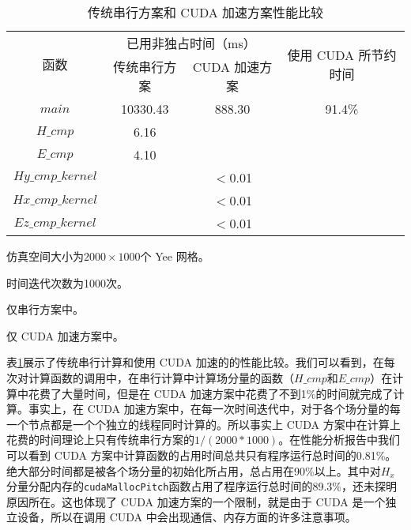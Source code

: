 \begin{table}[hp]
	\centering
	\begin{threeparttable}
		\caption{传统串行方案和 CUDA 加速方案性能比较}\label{ch4: cuda or not}
		\begin{tabular}{cccc}
			\toprule
			\multirow{2}{2em}{函数}&\multicolumn{2}{c}{已用非独占时间（ms）} & \multirow{2}{6em}{使用 CUDA 所节约时间}\\
			\cline{2-3}
			& 传统串行方案 & CUDA 加速方案 & \\ 
			
			\midrule
			$main$ & 10330.43 & 888.30 & 91.4\% \\
			$H\_cmp$\tnote{3} & 6.16 &  & \\ 
			$E\_cmp$\tnote{3} & 4.10 &  & \\
			$Hy\_cmp\_kernel$\tnote{4} &  & $<$0.01 & \\ 
			$Hx\_cmp\_kernel$\tnote{4} &  & $<$0.01 & \\ 
			$Ez\_cmp\_kernel$\tnote{4} &  & $<$0.01 & \\
			\bottomrule
		\end{tabular} 
		\begin{tablenotes}
			\item[1] 仿真空间大小为$2000\times1000$个 Yee 网格。
			\item[2] 时间迭代次数为1000次。
			\item[3] 仅串行方案中。
			\item[4] 仅 CUDA 加速方案中。
		\end{tablenotes}
	\end{threeparttable}
\end{table}

表\ref{ch4: cuda or not}展示了传统串行计算和使用 CUDA 加速的的性能比较。我们可以看到，在每次对计算函数的调用中，在串行计算中计算场分量的函数（$H\_cmp$和$E\_cmp$）在计算中花费了大量时间，但是在 CUDA 加速方案中花费了不到1\%的时间就完成了计算。事实上，在 CUDA 加速方案中，在每一次时间迭代中，对于各个场分量的每一个节点都是一个个独立的线程同时计算的。所以事实上 CUDA 方案中在计算上花费的时间理论上只有传统串行方案的$1/(2000*1000)$。在性能分析报告中我们可以看到 CUDA 方案中计算函数的占用时间总共只有程序运行总时间的0.81\%。绝大部分时间都是被各个场分量的初始化所占用，总占用在90\%以上。其中对$H_x$分量分配内存的\lstinline|cudaMallocPitch|函数占用了程序运行总时间的89.3\%，还未探明原因所在。这也体现了 CUDA 加速方案的一个限制，就是由于 CUDA 是一个独立设备，所以在调用 CUDA 中会出现通信、内存方面的许多注意事项。

